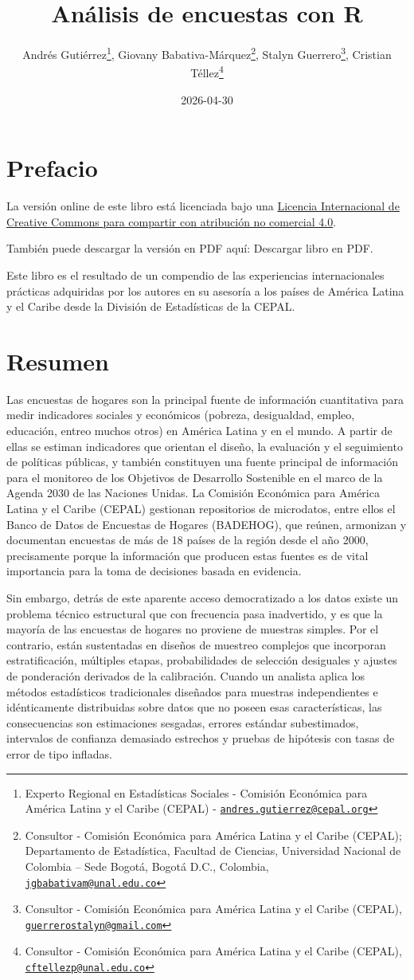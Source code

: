 \documentclass[
  spanish,
  12pt,
]{book}
\title{Análisis de encuestas con R}
\author{Andrés Gutiérrez\footnote{Experto Regional en Estadísticas Sociales - Comisión Económica para América Latina y el Caribe (CEPAL) - \href{mailto:andres.gutierrez@cepal.org}{\nolinkurl{andres.gutierrez@cepal.org}}}, Giovany Babativa-Márquez\footnote{Consultor - Comisión Económica para América Latina y el Caribe (CEPAL); Departamento de Estadística, Facultad de Ciencias, Universidad Nacional de Colombia -- Sede Bogotá, Bogotá D.C., Colombia, \href{mailto:jgbabativam@unal.edu.co}{\nolinkurl{jgbabativam@unal.edu.co}}}, Stalyn Guerrero\footnote{Consultor - Comisión Económica para América Latina y el Caribe (CEPAL), \href{mailto:guerrerostalyn@gmail.com}{\nolinkurl{guerrerostalyn@gmail.com}}}, Cristian Téllez\footnote{Consultor - Comisión Económica para América Latina y el Caribe (CEPAL), \href{mailto:cftellezp@unal.edu.co}{\nolinkurl{cftellezp@unal.edu.co}}}}
\date{2026-04-30}
\begin{document}
\maketitle

\renewcommand*\contentsname{Tabla de Contenido}
{
\setcounter{tocdepth}{1}
\tableofcontents
}
\listoffigures
\listoftables
\chapter*{Prefacio}\label{prefacio}

La versión online de este libro está licenciada bajo una \href{http://creativecommons.org/licenses/by-nc-sa/4.0/}{Licencia Internacional de Creative Commons para compartir con atribución no comercial 4.0}.

También puede descargar la versión en PDF aquí:
Descargar libro en PDF.

Este libro es el resultado de un compendio de las experiencias internacionales prácticas adquiridas por los autores en su asesoría a los países de América Latina y el Caribe desde la División de Estadísticas de la CEPAL.

\chapter*{Resumen}\label{resumen}

Las encuestas de hogares son la principal fuente de información cuantitativa para medir indicadores sociales y económicos (pobreza, desigualdad, empleo, educación, entreo muchos otros) en América Latina y en el mundo. A partir de ellas se estiman indicadores que orientan el diseño, la evaluación y el seguimiento de políticas públicas, y también constituyen una fuente principal de información para el monitoreo de los Objetivos de Desarrollo Sostenible en el marco de la Agenda 2030 de las Naciones Unidas. La Comisión Económica para América Latina y el Caribe (CEPAL) gestionan repositorios de microdatos, entre ellos el Banco de Datos de Encuestas de Hogares (BADEHOG), que reúnen, armonizan y documentan encuestas de más de 18 países de la región desde el año 2000, precisamente porque la información que producen estas fuentes es de vital importancia para la toma de decisiones basada en evidencia.

Sin embargo, detrás de este aparente acceso democratizado a los datos existe un problema técnico estructural que con frecuencia pasa inadvertido, y es que la mayoría de las encuestas de hogares no proviene de muestras simples. Por el contrario, están sustentadas en diseños de muestreo complejos que incorporan estratificación, múltiples etapas, probabilidades de selección desiguales y ajustes de ponderación derivados de la calibración. Cuando un analista aplica los métodos estadísticos tradicionales diseñados para muestras independientes e idénticamente distribuidas sobre datos que no poseen esas características, las consecuencias son estimaciones sesgadas, errores estándar subestimados, intervalos de confianza demasiado estrechos y pruebas de hipótesis con tasas de error de tipo infladas.
\end{document}
